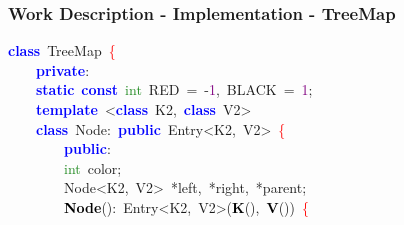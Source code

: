 \documentclass[table, usenames,dvipsnames,svgnames]{beamer}
\begin{document}
\begin{frame}

\frametitle{Work Description - Implementation - TreeMap}




\pause
\vspace{-2mm}
\begin{center}\begin{minipage}{90mm}
\begin{block}
\noindent
\mbox{}\textbf{\textcolor{Blue}{class}}\ \textcolor{TealBlue}{TreeMap}\ \textcolor{Red}{\{} \\
\mbox{}\ \ \ \ \textbf{\textcolor{Blue}{private}}\textcolor{BrickRed}{:} \\
\mbox{}\ \ \ \ \textbf{\textcolor{Blue}{static}}\ \textbf{\textcolor{Blue}{const}}\ \textcolor{ForestGreen}{int}\ RED\ \textcolor{BrickRed}{=}\ \textcolor{BrickRed}{-}\textcolor{Purple}{1}\textcolor{BrickRed}{,}\ BLACK\ \textcolor{BrickRed}{=}\ \textcolor{Purple}{1}\textcolor{BrickRed}{;}\  \\
\mbox{}\ \ \ \ \textbf{\textcolor{Blue}{template}}\ \textcolor{BrickRed}{\textless{}}\textbf{\textcolor{Blue}{class}}\ \textcolor{TealBlue}{K2}\textcolor{BrickRed}{,}\ \textbf{\textcolor{Blue}{class}}\ \textcolor{TealBlue}{V2}\textcolor{BrickRed}{\textgreater{}} \\
\mbox{}\ \ \ \ \textbf{\textcolor{Blue}{class}}\ \textcolor{TealBlue}{Node}\textcolor{BrickRed}{:}\ \textbf{\textcolor{Blue}{public}}\ Entry\textcolor{BrickRed}{\textless{}}K2\textcolor{BrickRed}{,}\ V2\textcolor{BrickRed}{\textgreater{}}\ \textcolor{Red}{\{} \\
\mbox{}\ \ \ \ \ \ \ \ \textbf{\textcolor{Blue}{public}}\textcolor{BrickRed}{:} \\
\mbox{}\ \ \ \ \ \ \ \ \textcolor{ForestGreen}{int}\ color\textcolor{BrickRed}{;} \\
\mbox{}\ \ \ \ \ \ \ \ \textcolor{TealBlue}{Node\textless{}K2,\ V2\textgreater{}}\ \textcolor{BrickRed}{*}left\textcolor{BrickRed}{,}\ \textcolor{BrickRed}{*}right\textcolor{BrickRed}{,}\ \textcolor{BrickRed}{*}parent\textcolor{BrickRed}{;} \\
\mbox{}\ \ \ \ \ \ \ \ \textbf{\textcolor{Black}{Node}}\textcolor{BrickRed}{():}\ Entry\textcolor{BrickRed}{\textless{}}K2\textcolor{BrickRed}{,}\ V2\textcolor{BrickRed}{\textgreater{}(}\textbf{\textcolor{Black}{K}}\textcolor{BrickRed}{(),}\ \textbf{\textcolor{Black}{V}}\textcolor{BrickRed}{())}\ \textcolor{Red}{\{} \\

\end{block}
\end{minipage}
\end{center}
\end{frame}
\end{document}
